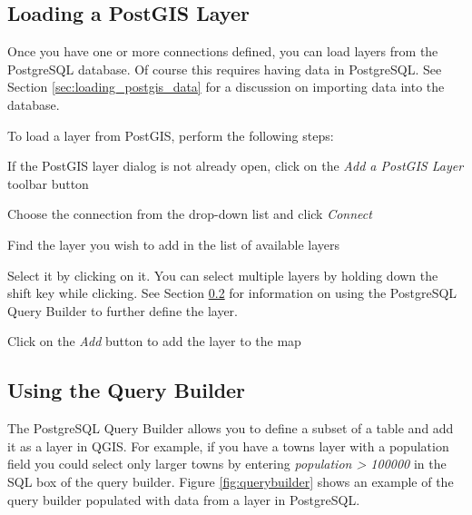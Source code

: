 \subsection{Loading a PostGIS Layer}
Once you have one or more connections defined, you can load layers from the PostgreSQL database. Of course this requires having data in PostgreSQL. See Section \ref{sec:loading_postgis_data} for a discussion on importing data into the database. 

To load a layer from PostGIS, perform the following steps:
\begin{compactenum}
\item If the PostGIS layer dialog is not already open, click on the \textit{Add a PostGIS Layer} toolbar button
\item Choose the connection from the drop-down list and click \textsl{Connect}
\item Find the layer you wish to add in the list of available layers
\item Select it by clicking on it. You can select multiple layers by holding down the shift key while clicking. See Section \ref{sec:query_builder} for information on using the PostgreSQL Query Builder to further define the layer.
\item Click on the \textsl{Add} button to add the layer to the map
\end{compactenum}
\subsection{Using the Query
Builder}\label{sec:query_builder}
The PostgreSQL Query Builder allows you to define a subset of a table and add it
as a layer in QGIS.  For example, if you have a towns layer with a population
field you could select only larger towns by entering \textsl{population >
100000} in the SQL box of the query builder. Figure \ref{fig:querybuilder} shows an
example of the query builder populated with data from a layer in PostgreSQL. 


